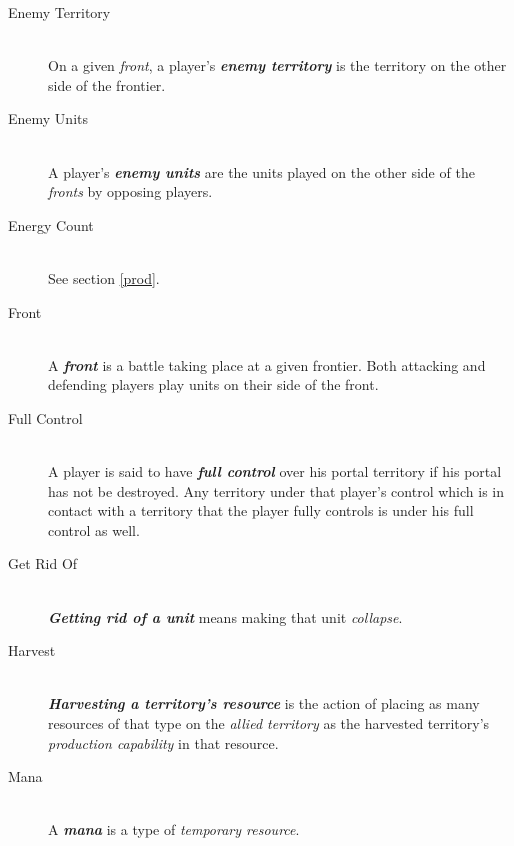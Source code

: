 \documentclass[a4paper]{article}
\begin{document}
\begin{description}
        \item[Enemy Territory] \hfill \\
            On a given \textit{front}, a player's \textbf{\textit{enemy territory}}
            is the territory on the other side of the frontier.
            
        \item[Enemy Units] \hfill \\
            A player's \textbf{\textit{enemy units}} are the units played on the other side
            of the \textit{fronts} by opposing players.
            
        \item[Energy Count] \hfill \\
            See section \ref{prod}.
            
        \item[Front] \hfill \\
            A \textbf{\textit{front}} is a battle taking place at a given frontier.
            Both attacking and defending players play units on their side of the front.
            
        \item[Full Control] \hfill \\
            A player is said to have \textbf{\textit{full control}} over his portal territory
            if his portal has not be destroyed.
            Any territory under that player's control which is in contact with
            a territory that the player fully controls is under his full control as well.
            
        \item[Get Rid Of] \hfill \\
            \textbf{\textit{Getting rid of a unit}} means making that unit
            \textit{collapse}.
            
        \item[Harvest] \hfill \\
            \textbf{\textit{Harvesting a territory's resource}} is the action of
            placing as many resources of that type on the \textit{allied territory}
            as the harvested territory's \textit{production capability} in that resource.
            
        \item[Mana] \hfill \\
            A \textbf{\textit{mana}} is a type of \textit{temporary resource}.
            

\end{description}
\end{document}
